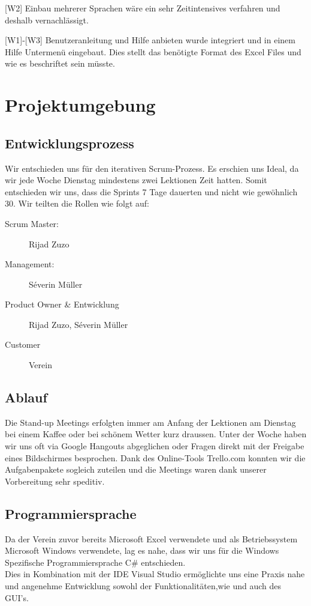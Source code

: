 \documentclass{article}
\begin{document}
[W2] Einbau mehrerer Sprachen wäre ein sehr Zeitintensives verfahren und deshalb vernachlässigt.

[W1]-[W3] Benutzeranleitung und Hilfe anbieten wurde integriert und in einem Hilfe Untermenü eingebaut. Dies stellt das benötigte Format des Excel Files und wie es beschriftet sein müsste.

\newpage

\section{Projektumgebung}
\vspace{5mm}
\subsection{Entwicklungsprozess	}
Wir entschieden uns für den iterativen Scrum-Prozess. Es erschien uns Ideal, da wir jede Woche Dienstag mindestens zwei Lektionen Zeit hatten. Somit entschieden wir uns, dass die Sprints 7 Tage dauerten und nicht wie gewöhnlich 30. Wir teilten die Rollen wie folgt auf:

\begin{description}
	\item[Scrum Master:] Rijad Zuzo
	\item[Management:] Séverin Müller
	\item[Product Owner \& Entwicklung] Rijad Zuzo, Séverin Müller
	\item[Customer] Verein
\end{description}

\subsection{Ablauf}
Die Stand-up Meetings erfolgten immer am Anfang der Lektionen am Dienstag bei einem Kaffee oder bei schönem Wetter kurz draussen. Unter der Woche haben wir uns oft via Google Hangouts abgeglichen oder Fragen direkt mit der Freigabe eines Bildschirmes besprochen. 
Dank des Online-Tools Trello.com konnten wir die Aufgabenpakete sogleich zuteilen und die Meetings waren dank unserer Vorbereitung sehr speditiv. 

\subsection{Programmiersprache}
Da der Verein zuvor bereits Microsoft Excel verwendete und als Betriebssystem Microsoft Windows verwendete, lag es nahe, dass wir uns für die Windows Spezifische Programmiersprache C\# entschieden. \\ Dies in Kombination mit der IDE Visual Studio ermöglichte uns eine Praxis nahe und angenehme Entwicklung sowohl der Funktionalitäten,wie und auch des GUI's. 
\end{document}
